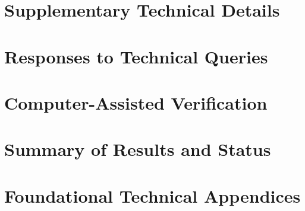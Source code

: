 \documentclass[11pt,a4paper]{report}
\begin{document}
\chapter{Supplementary Technical Details}
\label{ch:supplementary}





\chapter{Responses to Technical Queries}
\label{ch:review-response}




\chapter{Computer-Assisted Verification}
\label{ch:computer-verify}


\chapter{Summary of Results and Status}
\label{ch:resolution-summary}



\chapter{Foundational Technical Appendices}
\label{ch:diamond-standard}




\end{document}
